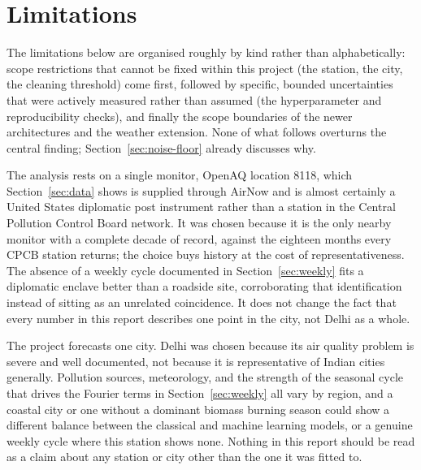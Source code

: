 \documentclass[12pt,a4paper]{report}
\begin{document}
\section{Limitations}
\label{sec:limitations}

The limitations below are organised roughly by kind rather than
alphabetically: scope restrictions that cannot be fixed within this
project (the station, the city, the cleaning threshold) come first,
followed by specific, bounded uncertainties that were actively measured
rather than assumed (the hyperparameter and reproducibility checks), and
finally the scope boundaries of the newer architectures and the weather
extension. None of what follows overturns the central finding; Section~\ref{sec:noise-floor} already discusses why.

The analysis rests on a single monitor, OpenAQ location 8118, which
Section~\ref{sec:data} shows is supplied through AirNow and is almost
certainly a United States diplomatic post instrument rather than a station in
the Central Pollution Control Board network. It was chosen because it is the
only nearby monitor with a complete decade of record, against the eighteen
months every CPCB station returns; the choice buys history at the cost of
representativeness. The absence of a weekly cycle documented in
Section~\ref{sec:weekly} fits a diplomatic enclave better than a roadside
site, corroborating that identification instead of sitting as an unrelated
coincidence. It does not change the fact that every number in this report
describes one point in the city, not Delhi as a whole.

The project forecasts one city. Delhi was chosen because its air quality
problem is severe and well documented, not because it is representative of
Indian cities generally. Pollution sources, meteorology, and the strength of
the seasonal cycle that drives the Fourier terms in Section~\ref{sec:weekly}
all vary by region, and a coastal city or one without a dominant biomass
burning season could show a different balance between the classical and
machine learning models, or a genuine weekly cycle where this station shows
none. Nothing in this report should be read as a claim about any station or
city other than the one it was fitted to.
\end{document}
